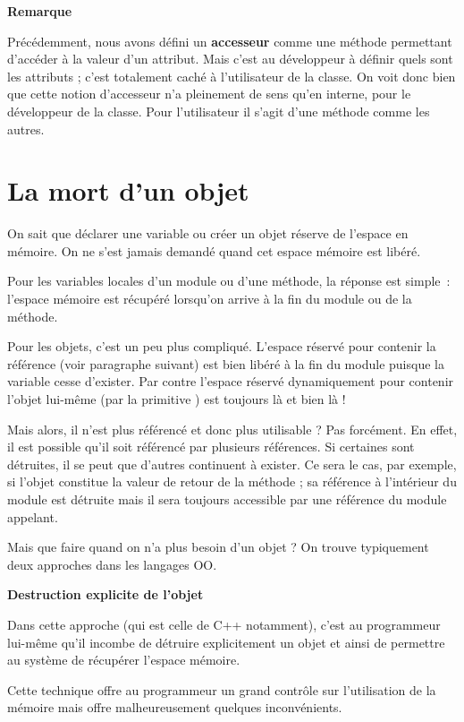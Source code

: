 {\bfseries
Remarque}

Précédemment, nous avons défini un \textbf{accesseur} comme une méthode
permettant d’accéder à la valeur d’un attribut. Mais c’est au
développeur à définir quels sont les attributs ; c’est totalement caché
à l’utilisateur de la classe. On voit donc bien que cette notion
d’accesseur n’a pleinement de sens qu’en interne, pour le développeur
de la classe. Pour l’utilisateur il s’agit d’une méthode comme les
autres.


\section{La mort d'un objet}

On sait que déclarer une variable ou créer un objet réserve de l’espace
en mémoire. On ne s’est jamais demandé quand cet espace mémoire est
libéré.

Pour les variables locales d’un module ou d'une
méthode, la réponse est simple~: l’espace mémoire est récupéré
lorsqu’on arrive à la fin du module ou de la méthode.

Pour les objets, c’est un peu plus compliqué. L’espace réservé pour
contenir la référence (voir paragraphe suivant) est bien libéré à la
fin du module puisque la variable cesse d’exister. Par contre l’espace
réservé dynamiquement pour contenir l’objet lui-même (par la primitive
) est toujours là et bien là !

Mais alors, il n’est plus référencé et donc plus utilisable ? Pas
forcément. En effet, il est possible qu’il soit référencé par plusieurs
références. Si certaines sont détruites, il se peut que d’autres
continuent à exister. Ce sera le cas, par exemple, si l’objet constitue
la valeur de retour de la méthode ; sa référence à l’intérieur du
module est détruite mais il sera toujours accessible par une référence
du module appelant.

Mais que faire quand on n’a plus besoin d’un objet ? On trouve
typiquement deux approches dans les langages OO.

{\sffamily\bfseries\upshape
Destruction explicite de l’objet}

Dans cette approche (qui est celle de C++ notamment), c’est au
programmeur lui-même qu’il incombe de détruire explicitement un objet
et ainsi de permettre au système de récupérer l’espace mémoire. 

Cette technique offre au programmeur un grand contrôle sur l’utilisation
de la mémoire mais offre malheureusement quelques inconvénients.

